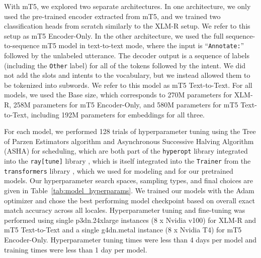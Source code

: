 \documentclass[11pt]{article}
\begin{document}
\begin{table*}[]
{{\begin{tabular}{c|ccc|ccc|cccl}
\bottomrule
\end{tabular}
}
}
\caption{Modeling results for (a) training runs on the full training dataset and (b) zero-shot training runs, in which training was performed only with en-US data, validation was performed with all locales, and testing was performed on all locales except for en-US. Each table includes the highest locale, the lowest locale, and locale-averaged results for intent accuracy, micro-averaged slot F1 score, and exact match accuracy. Intervals for 95\% confidence are given assuming normal distributions.}
\label{tab:test_results}
\end{table*}

With mT5, we explored two separate architectures.
In one architecture, we only used the pre-trained encoder extracted from mT5, and we trained two classification heads from scratch similarly to the XLM-R setup.
We refer to this setup as mT5 Encoder-Only.
In the other architecture, we used the full sequence-to-sequence mT5 model in text-to-text mode, where the input is ``\texttt{Annotate:}'' followed by the unlabeled utterance.
The decoder output is a sequence of labels (including the \texttt{Other} label) for all of the tokens followed by the intent.
We did not add the slots and intents to the vocabulary, but we instead allowed them to be tokenized into subwords.
We refer to this model as mT5 Text-to-Text.
For all models, we used the Base size, which corresponds to 270M parameters for XLM-R, 258M parameters for mT5 Encoder-Only, and 580M parameters for mT5 Text-to-Text, including 192M parameters for embeddings for all three.

For each model, we performed 128 trials of hyperparameter tuning using the Tree of Parzen Estimators algorithm and Asynchronous Successive Halving Algorithm (ASHA) \cite{Li2018MassivelyPH} for scheduling, which are both part of the \texttt{hyperopt} library \citep{pmlr-v28-bergstra13} integrated into the \texttt{ray[tune]} library \cite{liaw2018tune}, which is itself integrated into the \texttt{Trainer} from the \texttt{transformers} library \citep{wolf-etal-2020-transformers}, which we used for modeling and for our pretrained models.
Our hyperparameter search spaces, sampling types, and final choices are given in Table~\ref{tab:model_hyperparams}.
We trained our models with the Adam optimizer \citep{kingma2017adam} and chose the best performing model checkpoint based on overall exact match accuracy across all locales. 
Hyperparameter tuning and fine-tuning was performed using single p3dn.24xlarge instances (8 x Nvidia v100) for XLM-R and mT5 Text-to-Text and a single g4dn.metal instance (8 x Nvidia T4) for mT5 Encoder-Only. Hyperparameter tuning times were less than 4 days per model and training times were less than 1 day per model.
\end{document}
